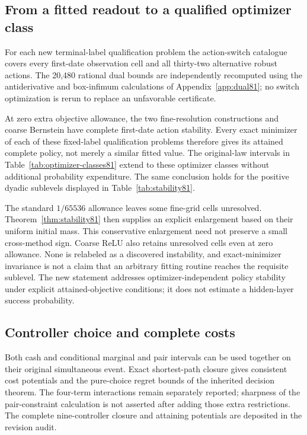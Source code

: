\subsection{From a fitted readout to a qualified optimizer class}
For each new terminal-label qualification problem the action-switch catalogue covers every first-date observation cell and all thirty-two alternative robust actions. The 20,480 rational dual bounds are independently recomputed using the antiderivative and box-infimum calculations of Appendix~\ref{app:dual81}; no switch optimization is rerun to replace an unfavorable certificate.




At zero extra objective allowance, the two fine-resolution constructions and coarse Bernstein have complete first-date action stability. Every exact minimizer of each of these fixed-label qualification problems therefore gives its attained complete policy, not merely a similar fitted value. The original-law intervals in Table~\ref{tab:optimizer-classes81} extend to these optimizer classes without additional probability expenditure. The same conclusion holds for the positive dyadic sublevels displayed in Table~\ref{tab:stability81}.

The standard $1/65536$ allowance leaves some fine-grid cells unresolved. Theorem~\ref{thm:stability81} then supplies an explicit enlargement based on their uniform initial mass. This conservative enlargement need not preserve a small cross-method sign. Coarse ReLU also retains unresolved cells even at zero allowance. None is relabeled as a discovered instability, and exact-minimizer invariance is not a claim that an arbitrary fitting routine reaches the requisite sublevel. The new statement addresses optimizer-independent policy stability under explicit attained-objective conditions; it does not estimate a hidden-layer success probability.

\subsection{Controller choice and complete costs}
Both cash and conditional marginal and pair intervals can be used together on their original simultaneous event. Exact shortest-path closure gives consistent cost potentials and the pure-choice regret bounds of the inherited decision theorem. The four-term interactions remain separately reported; sharpness of the pair-constraint calculation is not asserted after adding those extra restrictions. The complete nine-controller closure and attaining potentials are deposited in the revision audit.

